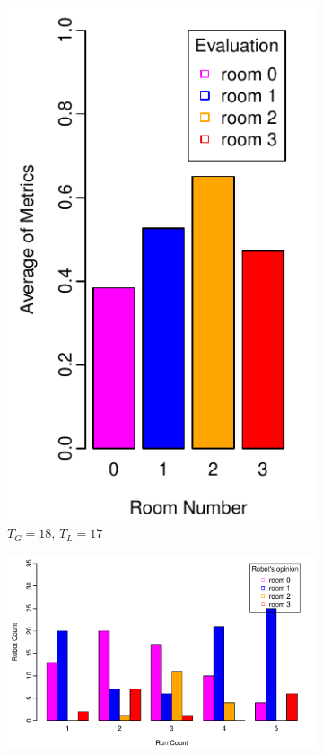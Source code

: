 \documentclass{llncs}
\begin{document}
\begin{figure}[h!]
        \begin{subfigure}[b]{0.25\textwidth}
                \includegraphics[width=\textwidth]{PLOT/EVAL/eval8}
                \caption{$T_G = 18$, $T_L = 17$}
                \label{fig:eval1}
        \end{subfigure}%
        \qquad
        \begin{subfigure}[b]{0.67\textwidth}
                \includegraphics[width=\textwidth]{PLOT/EXP/exp8}

\end{subfigure}
\end{figure}
\end{document}
